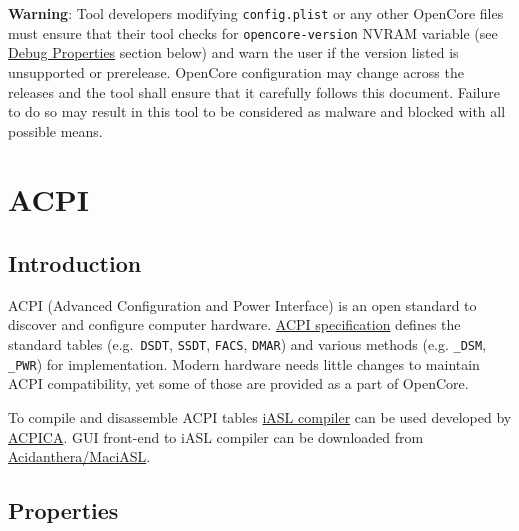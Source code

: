 \documentclass[]{article}
\makeatletter
\renewcommand{\label}[1]{%
\zref@wrapper@immediate{\oldlabel{#1}}}  %
\makeatother
\begin{document}
\textbf{Warning}: Tool developers modifying \texttt{config.plist} or any other OpenCore
files must ensure that their tool checks for \texttt{opencore-version} NVRAM variable
(see \hyperref[miscdebugprops]{Debug Properties} section below) and warn the user
if the version listed is unsupported or prerelease. OpenCore configuration may change
across the releases and the tool shall ensure that it carefully follows this document.
Failure to do so may result in this tool to be considered as malware and blocked with
all possible means.

\section{ACPI}\label{acpi}

\subsection{Introduction}\label{acpiintro}

ACPI (Advanced Configuration and Power Interface) is an open standard to
discover and configure computer hardware.
\href{https://uefi.org/specifications}{ACPI specification} defines the
standard tables (e.g.~\texttt{DSDT}, \texttt{SSDT}, \texttt{FACS}, \texttt{DMAR})
and various methods (e.g. \texttt{\_DSM}, \texttt{\_PWR}) for implementation.
Modern hardware needs little changes to maintain ACPI compatibility, yet
some of those are provided as a part of OpenCore.

To compile and disassemble ACPI tables \href{https://github.com/acpica/acpica}{iASL compiler}
can be used developed by \href{https://www.acpica.org}{ACPICA}. GUI front-end to iASL compiler
can be downloaded from \href{https://github.com/acidanthera/MaciASL/releases}{Acidanthera/MaciASL}.

\subsection{Properties}\label{acpiprops}
\end{document}
